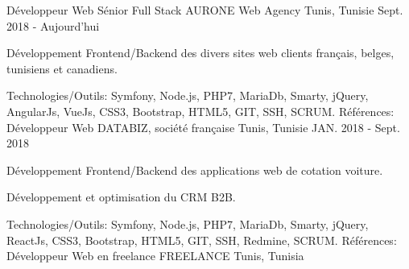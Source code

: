 \begin{cventries}
  \techentries
    {Développeur Web  Sénior Full Stack}
    {AURONE Web Agency}
    {Tunis, Tunisie}
    {Sept. 2018 - Aujourd'hui}
    {
      \begin{cvitems}
        \item {Développement Frontend/Backend des divers sites web clients français, belges, tunisiens et canadiens.}    
      \end{cvitems}
    }
    {\textcolor{awesome}{Technologies/Outils: } {\color{graytext}}  {Symfony, Node.js, PHP7, MariaDb, Smarty, jQuery, AngularJs, VueJs, CSS3, Bootstrap, HTML5, GIT, SSH, SCRUM.}}
    {Références:} 
    {
      \href{https://www.beaconsfield.ca/fr/}{} \break
      \href{http://www.advancia-training.com/}{} \break
      \href{https://www.talos.tn/}{} \break
    }
  \techentries
    {Développeur Web}
    {DATABIZ, société française}
    {Tunis, Tunisie}
    {JAN. 2018 - Sept. 2018}
    {
      \begin{cvitems}
		    \item {Développement Frontend/Backend des applications web de cotation voiture.}		
		    \item {Développement et optimisation du CRM B2B.}
      \end{cvitems}
    }
    {\textcolor{awesome}{Technologies/Outils: } {\color{graytext}}  {Symfony, Node.js, PHP7, MariaDb, Smarty, jQuery, ReactJs, CSS3, Bootstrap, HTML5, GIT, SSH, Redmine, SCRUM.}}
    {Références:} 
    {\href{https://www.reprise-citroen.fr/}{} \break
     \href{https://www.reprise-cash-bypeugeot.fr/}{} \break
     \href{https://www.reprise.dsautomobiles.fr/}{}\break
     \href{https://ankaufservice.renault.de/}{}\break
    }
  \techentries
    {Développeur Web en freelance}
    {FREELANCE}
    {Tunis, Tunisia}

\end{cventries}
